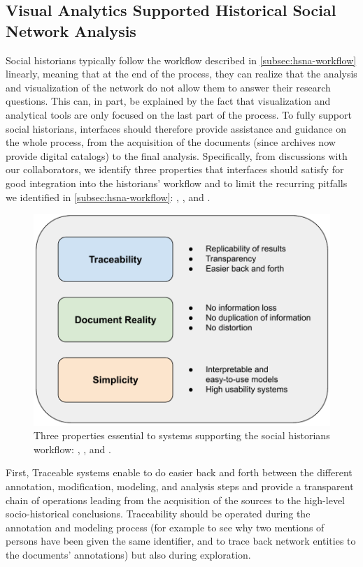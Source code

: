 \subsection{Visual Analytics Supported Historical Social Network Analysis}\label{subsec:hsna-properties}

Social historians typically follow the workflow described in \autoref{subsec:hsna-workflow} linearly, meaning that at the end of the process, they can realize that the analysis and visualization of the network do not allow them to answer their research questions\cite{lemercier12FormalNetwork2015}.
This can, in part, be explained by the fact that visualization and analytical \sna tools are only focused on the last part of the process.
To fully support social historians, \va interfaces should therefore provide assistance and guidance on the whole process, from the acquisition of the documents (since archives now provide digital catalogs) to the final analysis.
Specifically, from discussions with our collaborators, we identify three properties that \va interfaces should satisfy for good integration into the historians' workflow and to limit the recurring pitfalls we identified in \autoref{subsec:hsna-workflow}: \traceability, \reality, and \simplicity.
\begin{figure}[!ht]
    \centering
    \includegraphics[width=0.70\linewidth]{static/figures/HSNAProcess/properties}
    \caption{Three properties essential to \va systems supporting the social historians workflow: \traceability, \reality, and \simplicity.}\label{fig:HSNA-properties}
\end{figure}
First, Traceable systems enable to do easier back and forth between the different annotation, modification, modeling, and analysis steps and provide a transparent chain of operations leading from the acquisition of the sources to the high-level socio-historical conclusions.
Traceability should be operated during the annotation and modeling process (for example to see why two mentions of persons have been given the same identifier, and to trace back network entities to the documents' annotations) but also during exploration.
